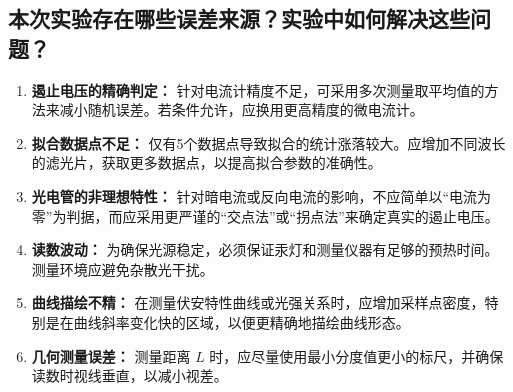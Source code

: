 \documentclass{../../templates/Report}%
\begin{document}
\begin{fullreportonly}
\subsection{本次实验存在哪些误差来源？实验中如何解决这些问题？}
\begin{enumerate}
    \item \textbf{遏止电压的精确判定：} 针对电流计精度不足，可采用多次测量取平均值的方法来减小随机误差。若条件允许，应换用更高精度的微电流计。
    \item \textbf{拟合数据点不足：} 仅有5个数据点导致拟合的统计涨落较大。应增加不同波长的滤光片，获取更多数据点，以提高拟合参数的准确性。
    \item \textbf{光电管的非理想特性：} 针对暗电流或反向电流的影响，不应简单以“电流为零”为判据，而应采用更严谨的“交点法”或“拐点法”来确定真实的遏止电压。
    \item \textbf{读数波动：} 为确保光源稳定，必须保证汞灯和测量仪器有足够的预热时间。测量环境应避免杂散光干扰。
    \item \textbf{曲线描绘不精：} 在测量伏安特性曲线或光强关系时，应增加采样点密度，特别是在曲线斜率变化快的区域，以便更精确地描绘曲线形态。
    \item \textbf{几何测量误差：} 测量距离 $L$ 时，应尽量使用最小分度值更小的标尺，并确保读数时视线垂直，以减小视差。
\end{enumerate}
\end{fullreportonly}
\insertnotes
\end{document}
